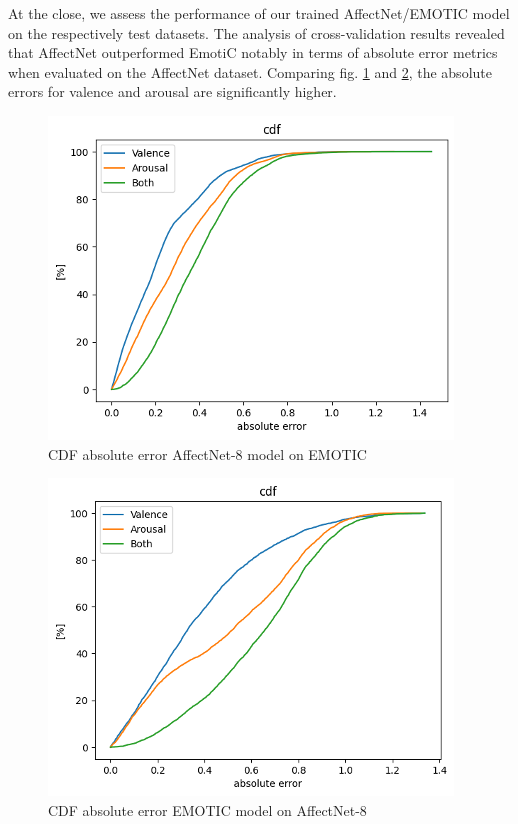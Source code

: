 \documentclass[conference]{IEEEtran}
\begin{document}
At the close, we assess the performance of our trained AffectNet/EMOTIC model on the respectively test datasets. The analysis of cross-validation results revealed that AffectNet outperformed EmotiC notably in terms of absolute error metrics when evaluated on the AffectNet dataset. Comparing fig. \ref{fig:affectnet8onemotic} and \ref{fig:emoticonaffectnet8}, the absolute errors for valence and arousal are significantly higher.

\begin{figure}[h]
    \centering
    \includegraphics[width = 0.9\columnwidth]{pictures/affectnet8onemotic.png}
    \caption{CDF absolute error AffectNet-8 model on EMOTIC}
    \label{fig:affectnet8onemotic}
\end{figure}

\vspace{-0.5cm}

\begin{figure}[h]
    \centering
    \includegraphics[width = 0.9\columnwidth]{pictures/emoticonaffectnet8.png}
    \caption{CDF absolute error EMOTIC model on AffectNet-8}
    \label{fig:emoticonaffectnet8}
\end{figure}
\end{document}
